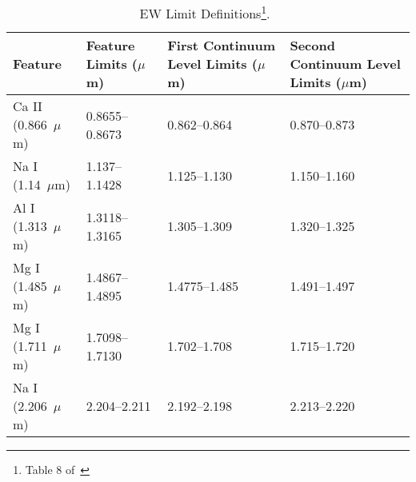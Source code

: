 \begin{table}[H]
    \caption{EW Limit Definitions\footnote{Table 8 of~\cite{Rayner_2009}}.~\label{tab:features}}
	\begin{tabular}{l|l|l|l}
		Feature & Feature Limits ($\mu$m) & First Continuum Level Limits ($\mu$m) & Second Continuum Level Limits ($\mu$m) \\ \hline
		Ca II (0.866~$\mu$m) & 0.8655--0.8673 & 0.862--0.864 & 0.870--0.873 \\
		Na I (1.14~$\mu$m) & 1.137--1.1428 & 1.125--1.130 & 1.150--1.160 \\
		Al I (1.313~$\mu$m) & 1.3118--1.3165 & 1.305--1.309 & 1.320--1.325 \\
		Mg I (1.485~$\mu$m) & 1.4867--1.4895 & 1.4775--1.485 & 1.491--1.497 \\
		Mg I (1.711~$\mu$m) & 1.7098--1.7130 & 1.702--1.708 & 1.715--1.720 \\
		Na I (2.206~$\mu$m) & 2.204--2.211 & 2.192--2.198 & 2.213--2.220 \\
	\end{tabular}
\end{table}